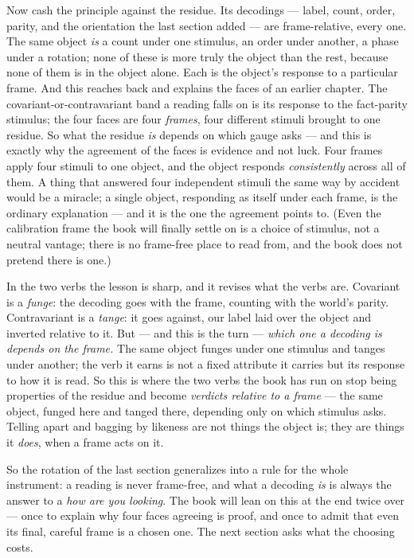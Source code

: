 Now cash the principle against the residue. Its decodings --- label, count, order, parity, and the orientation the last
section added --- are frame-relative, every one. The same object \emph{is} a count under one stimulus, an order under
another, a phase under a rotation; none of these is more truly the object than the rest, because none of them is in the
object alone. Each is the object's response to a particular frame. And this reaches back and explains the faces of an
earlier chapter. The covariant-or-contravariant band a reading falls on is its response to the fact-parity stimulus;
the four faces are four \emph{frames}, four different stimuli brought to one residue. So what the residue \emph{is}
depends on which gauge asks --- and this is exactly why the agreement of the faces is evidence and not luck. Four
frames apply four stimuli to one object, and the object responds \emph{consistently} across all of them. A thing that
answered four independent stimuli the same way by accident would be a miracle; a single object, responding as itself
under each frame, is the ordinary explanation --- and it is the one the agreement points to. (Even the calibration
frame the book will finally settle on is a choice of stimulus, not a neutral vantage; there is no frame-free place to
read from, and the book does not pretend there is one.)

In the two verbs the lesson is sharp, and it revises what the verbs are. Covariant is a \emph{funge}: the decoding goes
with the frame, counting with the world's parity. Contravariant is a \emph{tange}: it goes against, our label laid over
the object and inverted relative to it. But --- and this is the turn --- \emph{which one a decoding is depends on the
frame.} The same object funges under one stimulus and tanges under another; the verb it earns is not a fixed attribute
it carries but its response to how it is read. So this is where the two verbs the book has run on stop being properties
of the residue and become \emph{verdicts relative to a frame} --- the same object, funged here and tanged there,
depending only on which stimulus asks. Telling apart and bagging by likeness are not things the object is; they are
things it \emph{does}, when a frame acts on it.

So the rotation of the last section generalizes into a rule for the whole instrument: a reading is never frame-free,
and what a decoding \emph{is} is always the answer to a \emph{how are you looking}. The book will lean on this at the
end twice over --- once to explain why four faces agreeing is proof, and once to admit that even its final, careful
frame is a chosen one. The next section asks what the choosing costs.

